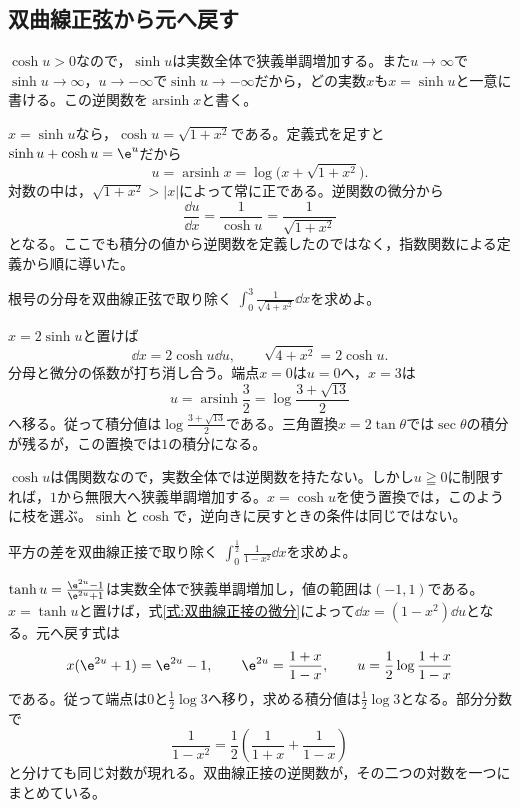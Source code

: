 \subsection{双曲線正弦から元へ戻す}

$\cosh u>0$なので，$\sinh u$は実数全体で狭義単調増加する。また$u\to\infty$で$\sinh u\to\infty$，$u\to-\infty$で$\sinh u\to-\infty$だから，どの実数$x$も$x=\sinh u$と一意に書ける。この逆関数を$\operatorname{arsinh}x$と書く。

$x=\sinh u$なら，$\cosh u=\sqrt{1+x^2}$である。定義式を足すと$\sinh u+\cosh u=\e^u$だから
\begin{equation}\label{式:逆双曲線正弦}
u=\operatorname{arsinh}x=\log\bigl(x+\sqrt{1+x^2}\bigr).
\end{equation}
対数の中は，$\sqrt{1+x^2}>|x|$によって常に正である。逆関数の微分から
\[
\frac{\dd u}{\dd x}=\frac1{\cosh u}
=\frac1{\sqrt{1+x^2}}
\]
となる。ここでも積分の値から逆関数を定義したのではなく，指数関数による定義から順に導いた。

\begin{example}{根号の分母を双曲線正弦で取り除く}
$\int_0^3\frac1{\sqrt{4+x^2}}\dd x$を求めよ。
\end{example}

$x=2\sinh u$と置けば
\[
\dd x=2\cosh u\dd u,\qquad
\sqrt{4+x^2}=2\cosh u.
\]
分母と微分の係数が打ち消し合う。端点$x=0$は$u=0$へ，$x=3$は
\[
u=\operatorname{arsinh}\frac32
=\log\frac{3+\sqrt{13}}2
\]
へ移る。従って積分値は$\log\frac{3+\sqrt{13}}2$である。三角置換$x=2\tan\theta$では$\sec\theta$の積分が残るが，この置換では$1$の積分になる。

$\cosh u$は偶関数なので，実数全体では逆関数を持たない。しかし$u\geqq0$に制限すれば，$1$から無限大へ狭義単調増加する。$x=\cosh u$を使う置換では，このように枝を選ぶ。$\sinh$と$\cosh$で，逆向きに戻すときの条件は同じではない。

\begin{example}{平方の差を双曲線正接で取り除く}
$\int_0^{\frac12}\frac1{1-x^2}\dd x$を求めよ。
\end{example}

$\tanh u=\frac{\e^{2u}-1}{\e^{2u}+1}$は実数全体で狭義単調増加し，値の範囲は$(-1,1)$である。$x=\tanh u$と置けば，式\eqref{式:双曲線正接の微分}によって$\dd x=(1-x^2)\dd u$となる。元へ戻す式は
\[
x(\e^{2u}+1)=\e^{2u}-1,\qquad
\e^{2u}=\frac{1+x}{1-x},\qquad
u=\frac12\log\frac{1+x}{1-x}
\]
である。従って端点は$0$と$\frac12\log3$へ移り，求める積分値は$\frac12\log3$となる。部分分数で
\[
\frac1{1-x^2}=\frac12\left(\frac1{1+x}+\frac1{1-x}\right)
\]
と分けても同じ対数が現れる。双曲線正接の逆関数が，その二つの対数を一つにまとめている。

